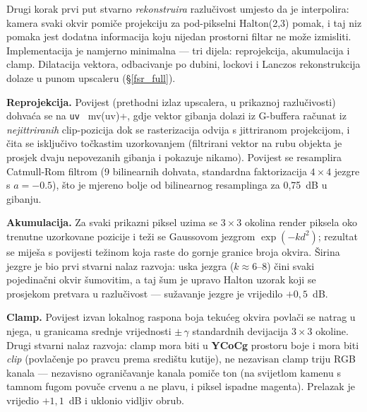 \documentclass{mathos}
\begin{document}
Drugi korak prvi put stvarno \emph{rekonstruira} razlučivost umjesto da je
interpolira: kamera svaki okvir pomiče projekciju za pod-pikselni Halton(2,3)
pomak, i taj niz pomaka jest dodatna informacija koju nijedan prostorni
filtar ne može izmisliti. Implementacija je namjerno minimalna — tri dijela:
reprojekcija, akumulacija i clamp. Dilatacija vektora, odbacivanje po dubini,
lockovi i Lanczos rekonstrukcija dolaze u punom upscaleru (\S\ref{fsr_full}).

\textbf{Reprojekcija.} Povijest (prethodni izlaz upscalera, u prikaznoj
razlučivosti) dohvaća se na \verb+uv + mv(uv)+, gdje vektor gibanja dolazi iz
G-buffera računat iz \emph{nejittriranih} clip-pozicija dok se rasterizacija
odvija s jittriranom projekcijom, i čita se isključivo točkastim uzorkovanjem
(filtrirani vektor na rubu objekta je prosjek dvaju nepovezanih gibanja i
pokazuje nikamo). Povijest se resamplira Catmull-Rom filtrom (9 bilinearnih
dohvata, standardna faktorizacija $4\times4$ jezgre s $a=-0.5$), što je
mjereno bolje od bilinearnog resamplinga za 0,75~dB u gibanju.

\textbf{Akumulacija.} Za svaki prikazni piksel uzima se $3\times3$ okolina
render piksela oko trenutne uzorkovane pozicije i teži se Gaussovom jezgrom
$\exp(-k d^2)$; rezultat se miješa s povijesti težinom koja raste do gornje
granice broja okvira. Širina jezgre je bio prvi stvarni nalaz razvoja: uska
jezgra ($k\approx6$--$8$) čini svaki pojedinačni okvir šumovitim, a taj šum
je upravo Halton uzorak koji se prosjekom pretvara u razlučivost — sužavanje
jezgre je vrijedilo $+0,5$~dB.

\textbf{Clamp.} Povijest izvan lokalnog raspona boja tekućeg okvira povlači
se natrag u njega, u granicama srednje vrijednosti $\pm\,\gamma$ standardnih
devijacija $3\times3$ okoline. Drugi stvarni nalaz razvoja: clamp mora biti u
\textbf{YCoCg} prostoru boje i mora biti \emph{clip} (povlačenje po pravcu
prema središtu kutije), ne nezavisan clamp triju RGB kanala — nezavisno
ograničavanje kanala pomiče ton (na svijetlom kamenu s tamnom fugom povuče
crvenu a ne plavu, i piksel ispadne magenta). Prelazak je vrijedio $+1,1$~dB
i uklonio vidljiv obrub.
\end{document}
